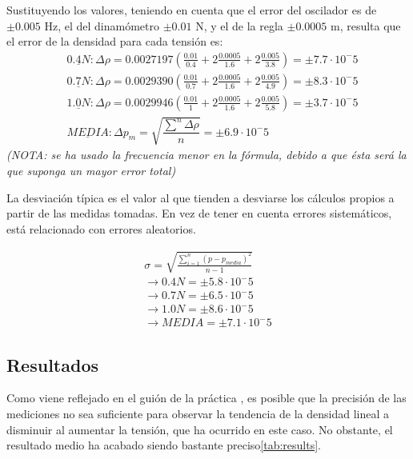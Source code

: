 \documentclass[fleqn,usenatbib,openbib]{mnras}
\begin{document}
Sustituyendo los valores, teniendo en cuenta que el error del oscilador es de $\pm 0.005$ Hz, el del dinamómetro $\pm 0.01$ N, y el de la regla $\pm 0.0005$ m, resulta que el error de la densidad para cada tensión es:
\begin{align*}
%
&\underline{0.4N}: \Delta\rho = 0.0027197(\frac{0.01}{0.4} + 2\frac{0.0005}{1.6} + 2\frac{0.005}{3.8}) = \boxed{\pm7.7\cdot10^-5}\\
&\underline{0.7N}: \Delta\rho = 0.0029390(\frac{0.01}{0.7} + 2\frac{0.0005}{1.6} + 2\frac{0.005}{4.9}) = \boxed{\pm8.3\cdot10^-5}\\
&\underline{1.0N}: \Delta\rho = 0.0029946(\frac{0.01}{1} + 2\frac{0.0005}{1.6} + 2\frac{0.005}{5.8}) = \boxed{\pm3.7\cdot10^-5}\\
&\underline{MEDIA}: \Delta p_{m} = \sqrt{\dfrac{\sum\limits^{n}\Delta\rho}{n}} = \boxed{\pm6.9\cdot10^-5}
%
\end{align*}
\textit{(NOTA: se ha usado la frecuencia menor en la fórmula, debido a que ésta será la que suponga un mayor error total)}

La desviación típica es el valor al que tienden a desviarse los cálculos propios a partir de las medidas tomadas. En vez de tener en cuenta errores sistemáticos, está relacionado con errores aleatorios.

\begin{gather}
%
\sigma = \sqrt{\frac{\sum\limits_{i=1}^{n}(p-p_{media})^2}{n-1}}\\
\nonumber\rightarrow 0.4N = \boxed{\pm5.8\cdot10^-5}\\
\nonumber\rightarrow 0.7N = \boxed{\pm6.5\cdot10^-5}\\
\nonumber\rightarrow 1.0N = \boxed{\pm8.6\cdot10^-5}\\
\nonumber\rightarrow MEDIA = \boxed{\pm7.1\cdot10^-5}
%
\end{gather}

\subsection{Resultados}

Como viene reflejado en el guión de la práctica \cite{labuam}, es posible que la precisión de las mediciones no sea suficiente para observar la tendencia de la densidad lineal a disminuir al aumentar la tensión, que ha ocurrido en este caso. No obstante, el resultado medio ha acabado siendo bastante preciso\cref{tab:results}.


\end{document}
